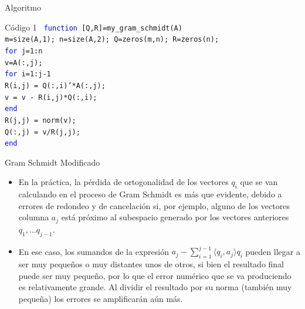 \documentclass{beamer}
\begin{document}
 \begin{frame}{Algoritmo}
 \begin{block}{C\'odigo 1}
 \texttt{
 \hspace{-0.25cm}\textcolor{blue}{function} [Q,R]=my\_gram\_schmidt(A)\\
 m=size(A,1); n=size(A,2); Q=zeros(m,n); R=zeros(n);\\
 \textcolor{blue}{for} j=1:n\\
 \hspace{0.25cm} v=A(:,j);\\
 \hspace{0.25cm} \textcolor{blue}{for} i=1:j-1\\
 \hspace{0.5cm} R(i,j) = Q(:,i)'*A(:,j);\\
 \hspace{0.5cm} v = v - R(i,j)*Q(:,i);\\
 \hspace{0.25cm} \textcolor{blue}{end}\\
 \hspace{0.25cm} R(j,j) = norm(v);\\
 \hspace{0.25cm} Q(:,j) = v/R(j,j);\\
 \textcolor{blue}{end}
 }
 \end{block}
 \end{frame}
\begin{frame}{Gram Schmidt Modificado}
  \begin{itemize}
   \item En la pr\'actica, la p\'erdida de ortogonalidad de los vectores $q_i$ que se van calculando en el proceso de Gram Schmidt es m\'as que evidente, debido a errores de redondeo y de cancelaci\'on si, por ejemplo, alguno de los vectores columna $a_j$ est\'a pr\'oximo al subespacio generado por los vectores anteriores $q_1, \ldots q_{j-1}$.
   \item<2-> En ese caso, los sumandos de la expresi\'on $a_j - \sum_{i=1}^{j-1}\langle q_i,a_j\rangle q_i$ pueden llegar a ser muy peque\~nos o muy distantes unos de otros, si bien el resultado final puede ser muy peque\~no, por lo que el error num\'erico que se va produciendo es relativamente grande. Al dividir el resultado por su norma (tambi\'en muy peque\~na) los errores se amplificar\'an a\'un m\'as.
  \end{itemize}
  \end{frame}
\end{document}
